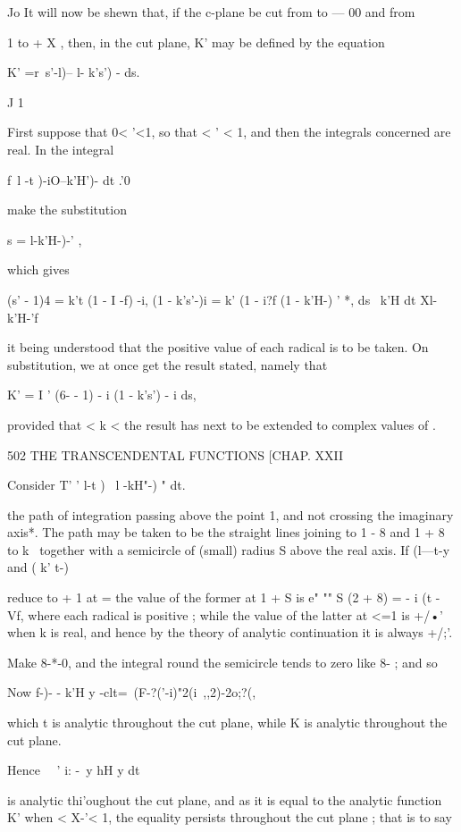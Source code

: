 Jo It will now be shewn that, if the c-plane be cut from to — 00 and
from

1 to + X , then, in the cut plane, K' may be defined by the equation

K' =r\ s'-l)-- l- k's') - ds.

J 1

First suppose that 0< '<1, so that < ' < 1, and then the integrals
concerned are real. In the integral

f\ l -t )-iO--k'H')- dt .'0

make the substitution

s = l-k'H-)-' ,

which gives

(s' - 1)4 = k't (1 - I -f) -i, (1 - k's'-)i = k' (1 - i?f (1 - k'H-) '
*, ds \ k'H dt Xl-k'H-'f

it being understood that the positive value of each radical is to be
taken. On substitution, we at once get the result stated, namely that

K' = I ' (6- - 1) - i (1 - k's') - i ds,

provided that < k <\; the result has next to be extended to complex
values of .

502 THE TRANSCENDENTAL FUNCTIONS [CHAP. XXII

Consider T' ' l-t )~ l -kH"-) " dt.

the path of integration passing above the point 1, and not crossing
the imaginary axis*. The path may be taken to be the straight lines
joining to 1 - 8 and 1 + 8 to k~ together with a semicircle of (small)
radius S above the real axis. If (l—t-y and ( k' t-)

reduce to + 1 at = the value of the former at 1 + S is e" "" S (2 + 8)
= - i (t - Vf, where each radical is positive ; while the value of the
latter at <=1 is +/•' when k is real, and hence by the theory of
analytic continuation it is always +/;'.

Make 8-*-0, and the integral round the semicircle tends to zero like
8- ; and so

Now f-)- - k'H y -clt=\ (F-?('-i)"2(i\ ,,2)-2o;?(,

which t is analytic throughout the cut plane, while K is analytic
throughout the cut plane.

Hence \ \ ' i: -\ y hH y dt

is analytic thi'oughout the cut plane, and as it is equal to the
analytic function K' when < X-'< 1, the equality persists throughout
the cut plane ; that is to say


